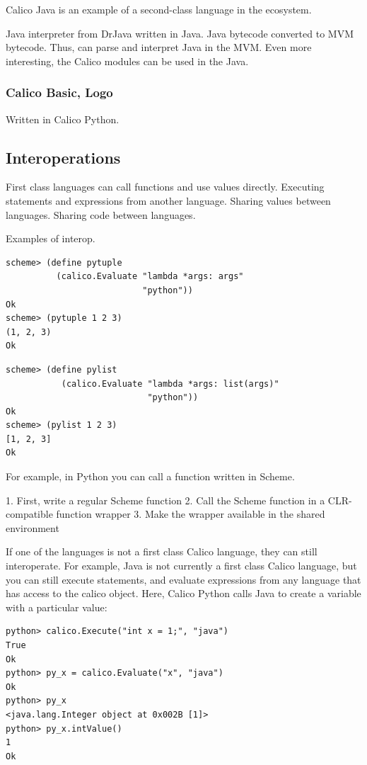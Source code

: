 \documentclass[preprint]{sigplanconf}
\begin{document}
Calico Java is an example of a second-class language in the ecosystem.

Java interpreter from DrJava written in Java. Java bytecode converted
to MVM bytecode. Thus, can parse and interpret Java in the MVM. Even
more interesting, the Calico modules can be used in the Java.

\subsubsection{Calico Basic, Logo}

Written in Calico Python. 

\subsection{Interoperations}

First class languages can call functions and use values
directly. Executing statements and expressions from another language.
Sharing values between languages.  Sharing code between languages.

Examples of interop.

\begin{verbatim}
scheme> (define pytuple 
          (calico.Evaluate "lambda *args: args" 
                           "python"))
Ok
scheme> (pytuple 1 2 3)
(1, 2, 3)
Ok
\end{verbatim}



\begin{verbatim}
scheme> (define pylist 
           (calico.Evaluate "lambda *args: list(args)" 
                            "python"))
Ok
scheme> (pylist 1 2 3)
[1, 2, 3]
Ok
\end{verbatim}

For example, in Python you can call a function written in Scheme.

1. First, write a regular Scheme function
2. Call the Scheme function in a CLR-compatible function wrapper
3. Make the wrapper available in the shared environment

If one of the languages is not a first class Calico language, they can
still interoperate. For example, Java is not currently a first class
Calico language, but you can still execute statements, and evaluate
expressions from any language that has access to the calico
object. Here, Calico Python calls Java to create a variable with a
particular value:

\begin{verbatim}
python> calico.Execute("int x = 1;", "java")
True
Ok
python> py_x = calico.Evaluate("x", "java")
Ok
python> py_x
<java.lang.Integer object at 0x002B [1]>
python> py_x.intValue()
1
Ok
\end{verbatim}
\end{document}
